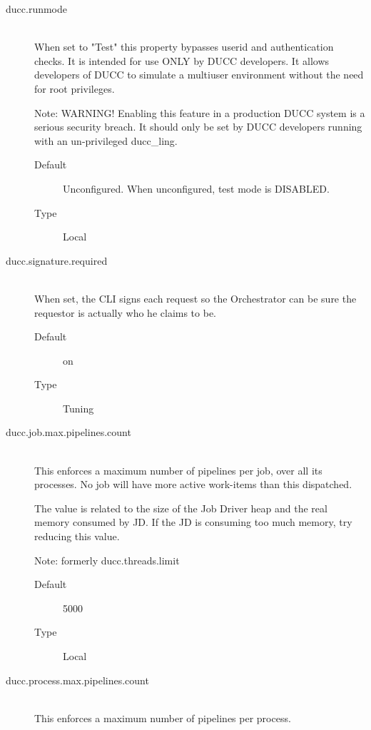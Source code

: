 \begin{description}
       \item[ducc.runmode] \hfill \\
         When set to "Test" this property bypasses userid and authentication checks. It is intended 
         for use ONLY by DUCC developers. It allows developers of DUCC to simulate a multiuser 
         environment without the need for root privileges. 
         
         Note: WARNING! Enabling this feature in a production DUCC system is a serious
         security breach. It should only be set by DUCC developers running with an un-privileged
         ducc\_ling.
         \begin{description}
           \item[Default] Unconfigured. When unconfigured, test mode is DISABLED.
           \item[Type] Local 
         \end{description}


        \item[ducc.signature.required] \hfill \\
          When set, the CLI signs each request so the Orchestrator can be sure the requestor is 
          actually who he claims to be. 
          \begin{description}            
            \item[Default] on             
            \item[Type] Tuning 
          \end{description}


       \item[ducc.job.max.pipelines.count] \hfill \\
         This enforces a maximum number of pipelines per job, over all its processes. No 
         job will have more active work-items than this dispatched.

         The value is related to the size of the Job Driver heap and the real memory consumed by JD.
         If the JD is consuming too much memory, try reducing this value.
         
         Note: formerly ducc.threads.limit
         
         \begin{description}
           \item[Default] 5000 
           \item[Type] Local 
         \end{description}

      \item[ducc.process.max.pipelines.count] \hfill \\
         This enforces a maximum number of pipelines per process.


\end{description}
